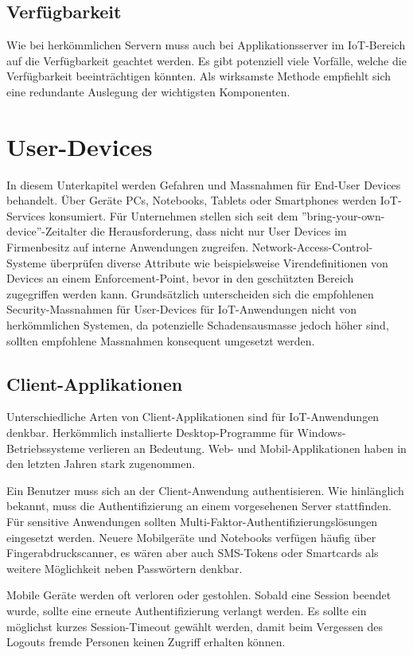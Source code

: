 \subsection{Verfügbarkeit}
Wie bei herkömmlichen Servern muss auch bei Applikationsserver im IoT-Bereich auf die Verfügbarkeit geachtet werden. Es gibt potenziell viele Vorfälle, welche die Verfügbarkeit beeinträchtigen könnten. Als wirksamste Methode empfiehlt sich eine redundante Auslegung der wichtigsten Komponenten.

\section{User-Devices}
In diesem Unterkapitel werden Gefahren und Massnahmen für End-User Devices behandelt. Über Geräte PCs, Notebooks, Tablets oder Smartphones werden IoT-Services konsumiert. Für Unternehmen stellen sich seit dem ''bring-your-own-device''-Zeitalter die Herausforderung, dass nicht nur User Devices im Firmenbesitz auf interne Anwendungen zugreifen. Network-Access-Control-Systeme überprüfen diverse Attribute wie beispielsweise Virendefinitionen von Devices an einem Enforcement-Point, bevor in den geschützten Bereich zugegriffen werden kann. Grundsätzlich unterscheiden sich die empfohlenen Security-Massnahmen für User-Devices für IoT-Anwendungen nicht von herkömmlichen Systemen, da potenzielle Schadensausmasse jedoch höher sind, sollten empfohlene Massnahmen konsequent umgesetzt werden.

\subsection{Client-Applikationen}
Unterschiedliche Arten von Client-Applikationen sind für IoT-Anwendungen denkbar. Herkömmlich installierte Desktop-Programme für Windows-Betriebssysteme verlieren an Bedeutung. Web- und Mobil-Applikationen haben in den letzten Jahren stark zugenommen. 

Ein Benutzer muss sich an der Client-Anwendung authentisieren. Wie hinlänglich bekannt, muss die Authentifizierung an einem vorgesehenen Server stattfinden. Für sensitive Anwendungen sollten Multi-Faktor-Authentifizierungslösungen eingesetzt werden. Neuere Mobilgeräte und Notebooks verfügen häufig über Fingerabdruckscanner, es wären aber auch SMS-Tokens oder Smartcards als weitere Möglichkeit neben Passwörtern denkbar.

Mobile Geräte werden oft verloren oder gestohlen. Sobald eine Session beendet wurde, sollte eine erneute Authentifizierung verlangt werden. Es sollte ein möglichst kurzes Session-Timeout gewählt werden, damit beim Vergessen des Logouts fremde Personen keinen Zugriff erhalten können.

